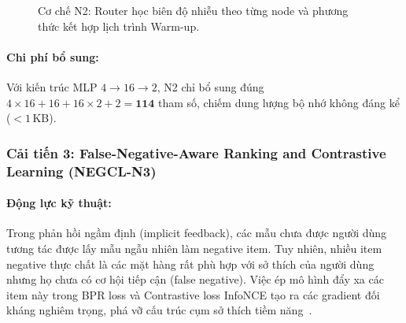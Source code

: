 \begin{figure}[H]
\centering
{}
\caption{Cơ chế N2: Router học biên độ nhiễu theo từng node và phương thức kết hợp lịch trình Warm-up.}
\label{fig:negcl_n2}
\end{figure}

\paragraph{Chi phí bổ sung:}
Với kiến trúc MLP $4 \to 16 \to 2$, N2 chỉ bổ sung đúng $4 \times 16 + 16 + 16 \times 2 + 2 = \mathbf{114}$ tham số, chiếm dung lượng bộ nhớ không đáng kể ($<1$\,KB).

\subsubsection{Cải tiến 3: False-Negative-Aware Ranking and Contrastive Learning (NEGCL-N3)}

\paragraph{Động lực kỹ thuật:}
Trong phản hồi ngầm định (implicit feedback), các mẫu chưa được người dùng tương tác được lấy mẫu ngẫu nhiên làm negative item. Tuy nhiên, nhiều item negative thực chất là các mặt hàng rất phù hợp với sở thích của người dùng nhưng họ chưa có cơ hội tiếp cận (false negative). Việc ép mô hình đẩy xa các item này trong BPR loss và Contrastive loss InfoNCE tạo ra các gradient đối kháng nghiêm trọng, phá vỡ cấu trúc cụm sở thích tiềm năng~\cite{balmaseda2025discovering}.

